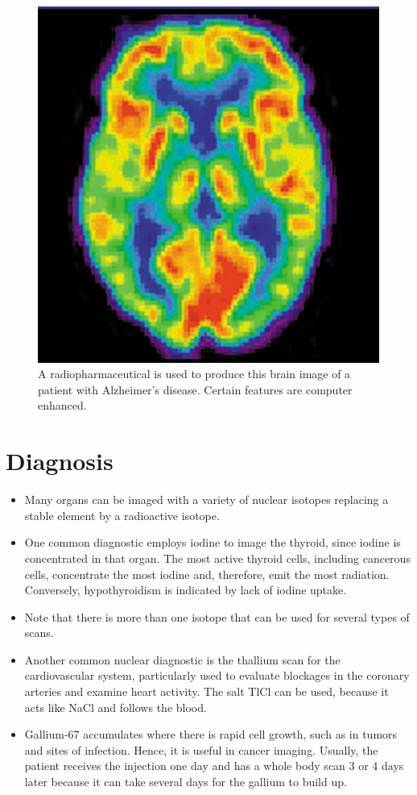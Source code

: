 \documentclass[12pt]{book}
\begin{document}
\begin{figure}
\centering
\includegraphics[scale=0.5]{radiomedicine.jpeg}
\caption{A radiopharmaceutical is used to produce this brain image of a patient with Alzheimer’s disease. Certain features are computer enhanced.}
\end{figure}

\section{Diagnosis}
\begin{itemize}
    \item  Many organs can be imaged with a variety of nuclear isotopes replacing a stable element by a radioactive isotope.
    \item One common diagnostic employs iodine to image the thyroid, since iodine is concentrated in that organ. The most active thyroid cells, including cancerous cells, concentrate the most iodine and, therefore, emit the most radiation. Conversely, hypothyroidism is indicated by lack of iodine uptake.
    \item Note that there is more than one isotope that can be used for several types of scans.
    \item Another common nuclear diagnostic is the thallium scan for the cardiovascular system, particularly used to evaluate blockages in the coronary arteries and examine heart activity. The salt TlCl can be used, because it acts like NaCl and follows the blood.
    \item Gallium-67 accumulates where there is rapid cell growth, such as in tumors and sites of infection. Hence, it is useful in cancer imaging. Usually, the patient receives the injection one day and has a whole body scan 3 or 4 days later because it can take several days for the gallium to build up.
\end{itemize}
\end{document}
